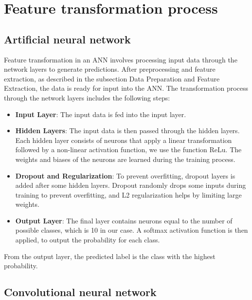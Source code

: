 \section{Feature transformation process}

\subsection{Artificial neural network}

Feature transformation in an ANN involves processing input data through the network layers to generate predictions.
After preprocessing and feature extraction, as described in the subsection Data Preparation and Feature Extraction, the data is ready for input into the ANN. 
The transformation process through the network layers includes the following steps:
\begin{itemize}
    \item \textbf{Input Layer}: The input data is fed into the input layer.
    \item \textbf{Hidden Layers}: The input data is then passed through the hidden layers. Each hidden layer consists of neurons that apply a linear transformation followed by a non-linear activation function, we use the function ReLu. The weights and biases of the neurons are learned during the training process.
    \item \textbf{Dropout and Regularization}: To prevent overfitting, dropout layers is added after some hidden layers. Dropout randomly drops some inputs during training to prevent overfitting, and L2 regularization helps by limiting large weights.
    \item \textbf{Output Layer}: The final layer contains neurons equal to the number of possible classes, which is 10 in our case. A softmax activation function is then applied, to output the probability for each class.
\end{itemize}
From the output layer, the predicted label is the class with the highest probability.

\subsection{Convolutional neural network}


